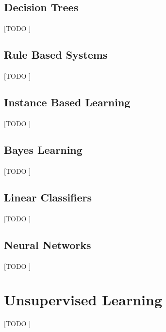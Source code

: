 \documentclass{article}
\begin{document}
		\subsection{Decision Trees}
		\label{sec:decision-trees}

			\paragraph{}
			[TODO ]

		\subsection{Rule Based Systems}
		\label{sec:decision-trees}

			\paragraph{}
			[TODO ]

		\subsection{Instance Based Learning}
		\label{sec:decision-trees}

			\paragraph{}
			[TODO ]

		\subsection{Bayes Learning}
		\label{sec:decision-trees}

			\paragraph{}
			[TODO ]

		\subsection{Linear Classifiers}
		\label{sec:decision-trees}

			\paragraph{}
			[TODO ]

		\subsection{Neural Networks}
		\label{sec:decision-trees}

			\paragraph{}
			[TODO ]

	\section{Unsupervised Learning}
	\label{sec:unsupervised-learning}

			\paragraph{}
			[TODO ]


	\nocite{subject:taa}

  
  
\end{document}
